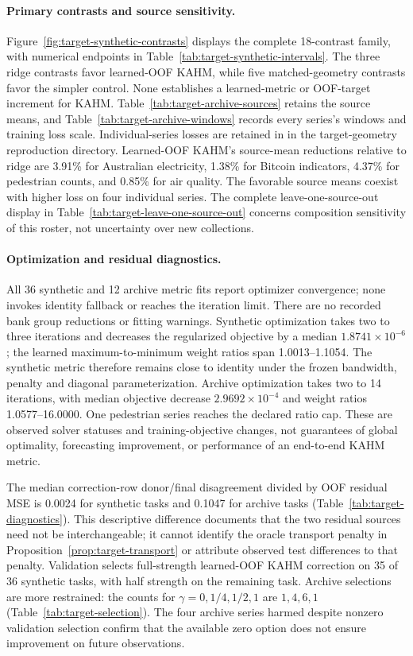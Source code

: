 \paragraph{Primary contrasts and source sensitivity.}
Figure~\ref{fig:target-synthetic-contrasts} displays the complete
18-contrast family, with numerical endpoints in
Table~\ref{tab:target-synthetic-intervals}. The three ridge contrasts
favor learned-OOF KAHM, while five matched-geometry contrasts favor
the simpler control. None establishes a learned-metric or OOF-target
increment for KAHM. Table~\ref{tab:target-archive-sources} retains
the source means, and Table~\ref{tab:target-archive-windows} records
every series's windows and training loss scale. Individual-series
losses are retained in  in the target-geometry reproduction directory. Learned-OOF KAHM's source-mean
reductions relative to ridge are 3.91\% for Australian electricity,
1.38\% for Bitcoin indicators, 4.37\% for pedestrian counts, and
0.85\% for air quality. The favorable source means coexist with higher loss on four
individual series. The complete leave-one-source-out
display in Table~\ref{tab:target-leave-one-source-out} concerns
composition sensitivity of this roster, not uncertainty over new
collections.

\paragraph{Optimization and residual diagnostics.}
All 36 synthetic and 12 archive metric fits report optimizer
convergence; none invokes identity fallback or reaches the iteration
limit. There are no recorded bank group reductions or fitting warnings.
Synthetic optimization takes two to three iterations and decreases
the regularized objective by a median $1.8741\times10^{-6}$; the
learned maximum-to-minimum weight ratios span 1.0013--1.1054. The
synthetic metric therefore remains close to identity under the frozen
bandwidth, penalty and diagonal parameterization. Archive optimization
takes two to 14 iterations, with median objective decrease
$2.9692\times10^{-4}$ and weight ratios 1.0577--16.0000. One pedestrian
series reaches the declared ratio cap. These are observed solver
statuses and training-objective changes, not guarantees of global
optimality, forecasting improvement, or performance of an
end-to-end KAHM metric.

The median correction-row donor/final disagreement divided by OOF
residual MSE is 0.0024 for synthetic tasks and 0.1047 for archive tasks
(Table~\ref{tab:target-diagnostics}). This descriptive difference
documents that the two residual sources need not be interchangeable;
it cannot identify the oracle transport penalty in
Proposition~\ref{prop:target-transport} or attribute observed test
differences to that penalty. Validation selects full-strength
learned-OOF KAHM correction on 35 of 36 synthetic tasks, with half
strength on the remaining task. Archive selections are more restrained:
the counts for $\gamma=0,1/4,1/2,1$ are $1,4,6,1$
(Table~\ref{tab:target-selection}). The four archive series harmed
despite nonzero validation selection confirm that the available zero
option does not ensure improvement on future observations.

